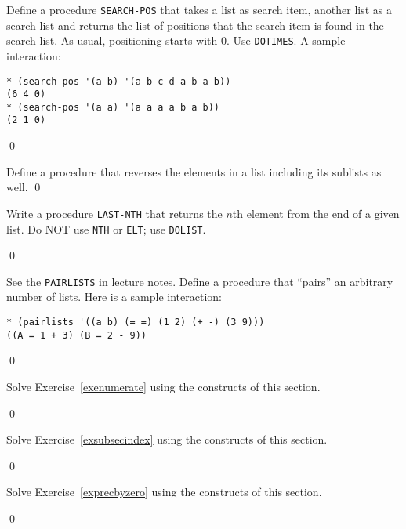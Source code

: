 \documentclass[a4paper,11pt]{article}
\begin{document}
\begin{uexercise}
Define a procedure \Verb+SEARCH-POS+ that takes a list as search item, another list as a search list and returns the list of positions that the search item is found in the search list. As usual, positioning starts with 0. Use \Verb+DOTIMES+. A sample interaction:

{\small
\begin{Verbatim}
* (search-pos '(a b) '(a b c d a b a b))
(6 4 0)
* (search-pos '(a a) '(a a a a b a b))
(2 1 0)
\end{Verbatim}
}
\qed
\end{uexercise}

\begin{uexercise}
Define a procedure that reverses the elements in a list including its sublists as well.
\qed
\end{uexercise}

\begin{uexercise}
Write a procedure \Verb+LAST-NTH+ that returns the $n$th element from the end of a given list. Do NOT use \Verb+NTH+ or \Verb+ELT+; use \Verb+DOLIST+.

\qed
\end{uexercise}

\begin{uexercise}

See the \Verb+PAIRLISTS+ in lecture notes. Define a procedure that ``pairs'' an arbitrary number of lists. Here is a sample interaction:
{\small
\begin{Verbatim}
* (pairlists '((a b) (= =) (1 2) (+ -) (3 9)))
((A = 1 + 3) (B = 2 - 9))
\end{Verbatim}
}

\qed
\end{uexercise}

\begin{uexercise}

Solve Exercise~\ref{exenumerate} using the constructs of this section.

\qed
\end{uexercise}

\begin{uexercise}

Solve Exercise~\ref{exsubsecindex} using the constructs of this section.

\qed
\end{uexercise}

\begin{uexercise}

Solve Exercise~\ref{exprecbyzero} using the constructs of this section.

\qed
\end{uexercise}
\end{document}
